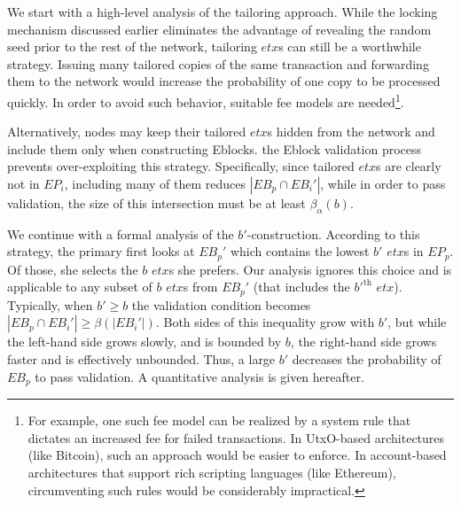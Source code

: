 We start with a high-level analysis of the tailoring approach. While the locking mechanism discussed earlier eliminates the advantage of revealing the random seed prior to the rest of the network, tailoring $etx$s can still be a worthwhile strategy. Issuing many tailored copies of the same transaction and forwarding them to the network would increase the probability of one copy to be processed quickly. In order to avoid such behavior, suitable fee models are needed\footnote{For example, one such fee model can be realized by a system rule that dictates an increased fee for failed transactions. In UtxO-based architectures (like Bitcoin), such an approach would be easier to enforce. In account-based architectures that support rich scripting languages (like Ethereum), circumventing such rules would be considerably impractical.}. 

Alternatively, nodes may keep their tailored $etx$s hidden from the network and include them only when constructing Eblocks. %
the \name Eblock validation process prevents over-exploiting this strategy. Specifically, since tailored $etx$s are clearly not in $EP_i$, including many of them reduces $|EB_p\cap EB_i'|$, while in order to pass validation, the size of this intersection must be at least $\beta_{\alpha}(b)$.

We continue with a formal analysis of the $b'$-construction. According to this strategy, the primary first looks at $EB_p'$ which contains the lowest $b'$ $etx$s in $EP_p$. Of those, she selects the $b$ $etx$s she prefers. Our analysis ignores this choice and is applicable to any subset of $b$ $etx$s from $EB_p'$ (that includes the $b'^{\text{th}}$ $etx$). Typically, when $b'\ge b$ the validation condition becomes $|EB_p\cap EB_i'|\ge \beta(|EB_i'|)$. Both sides of this inequality grow with $b'$, but while the left-hand side grows slowly, and is bounded by $b$, the right-hand side grows faster and is effectively unbounded. Thus, a large $b'$ decreases the probability of $EB_p$ to pass validation. A quantitative analysis is given hereafter.

